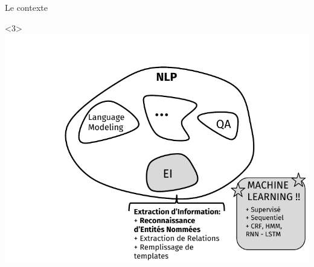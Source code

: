 \documentclass[10pt]{beamer}
\begin{document}
\begin{frame}{Le contexte}
	\begin{onlyenv}\vspace*{\fill}\includegraphics[width=1\linewidth]{"img/nlp_diag3"}\vspace*{\fill}\end{onlyenv}
\end{frame}
\end{document}
